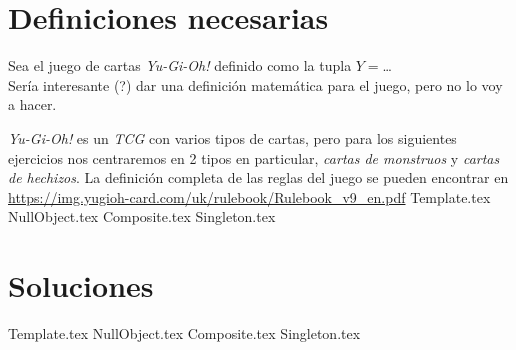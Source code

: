 \section{Definiciones necesarias}
  Sea el juego de cartas \textit{Yu-Gi-Oh!} definido como la tupla 
  $Y = $\dots\\
  Sería interesante (?) dar una definición matemática para el juego, pero no lo voy a 
  hacer.

  \textit{Yu-Gi-Oh!} es un \textit{TCG} con varios tipos de cartas, pero para los 
  siguientes ejercicios nos centraremos en 2 tipos en particular, \textit{cartas de 
  monstruos} y \textit{cartas de hechizos}.
  La definición completa de las reglas del juego se pueden encontrar en 
  \url{https://img.yugioh-card.com/uk/rulebook/Rulebook_v9_en.pdf}
%
{Template.tex} 
{NullObject.tex}
{Composite.tex}
{Singleton.tex}

\pagebreak
\section{Soluciones}
  {Template.tex}
  {NullObject.tex}
  {Composite.tex}
  {Singleton.tex}

%